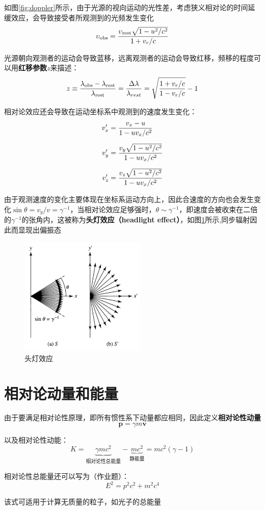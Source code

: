 如图\ref{fig:doppler}所示，由于光源的视向运动的光性差，考虑狭义相对论的时间延缓效应，会导致接受者所观测到的光频发生变化
\begin{equation}
  \upsilon_\mathrm{obs}={\upsilon_\mathrm{rest}\sqrt{1-u^2/c^2}\over 1+v_r/c}
  \label{eq:doppler}
\end{equation}

光源朝向观测者的运动会导致蓝移，远离观测者的运动会导致红移，频移的程度可以用\textbf{红移参数}$z$来描述：
\begin{equation}
  z\equiv{\lambda_\mathrm{obs}-\lambda_\mathrm{rest}\over \lambda_\mathrm{rest}}={\Delta\lambda \over \lambda_{rest}}=\sqrt{{1+v_r/c \over 1-v_r/c}}-1
\end{equation}

相对论效应还会导致在运动坐标系中观测到的速度发生变化：
\begin{align}
  v_x' &={v_x-u \over 1-uv_x/c^2}\\[2mm]
  v_y' &={v_y\sqrt{1-u^2/c^2} \over 1-uv_x/c^2}\\[2mm]
  v_z' &={v_z\sqrt{1-u^2/c^2} \over 1-uv_x/c^2}
\end{align}

由于观测速度的变化主要体现在坐标系运动方向上，因此合速度的方向也会发生变化$\sin\theta={v_y /v}=\gamma^{-1}$，当相对论效应足够强时，$\theta\sim\gamma^{-1}$，即速度会被收束在二倍的$\gamma^{-1}$的张角内，这被称为\textbf{头灯效应（headlight effect）}，如图\ref{fig:beaming}所示,同步辐射因此而显现出偏振态

\begin{figure}[hbt]
  \centering
  \includegraphics[width=6cm]{chapters/05/beaming}
  \caption{头灯效应}
  \label{fig:beaming}
\end{figure}


\section{相对论动量和能量}
由于要满足相对论性原理，即所有惯性系下动量都应相同，因此定义\textbf{相对论性动量}
\begin{equation}
  \mathbf p=\gamma m \mathbf v
\end{equation}

以及相对论性动能：
\begin{equation}
  K=\underbrace{ \gamma mc^2}_\text{相对论性总能量}-\underbrace{mc^2}_\text{静能量}=mc^2(\gamma-1)
\end{equation}

相对论性总能量还可以写为（作业题）：
\begin{equation}
  E^2=p^2c^2+m^2c^4
\end{equation}

该式可适用于计算无质量的粒子，如光子的总能量